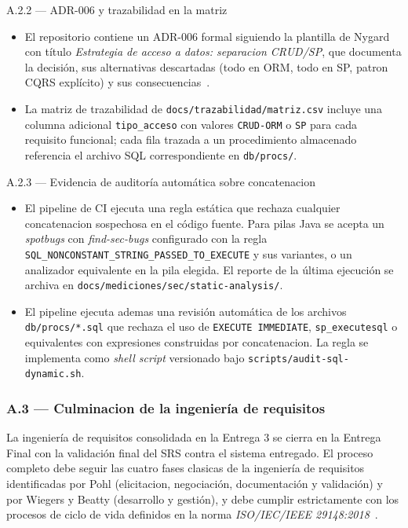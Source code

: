 \documentclass[11pt,a4paper]{article}
\begin{document}
\begin{cajarepo}{A.2.2 --- ADR-006 y trazabilidad en la matriz}
    \begin{itemize}
        \item El repositorio contiene un ADR-006 formal siguiendo la plantilla de Nygard con t\'{i}tulo \emph{Estrategia de acceso a datos: separacion CRUD/SP}, que documenta la decisi\'{o}n, sus alternativas descartadas (todo en ORM, todo en SP, patron CQRS expl\'{i}cito) y sus consecuencias~\cite{nygard2011adr}.
        \item La matriz de trazabilidad de \texttt{docs/trazabilidad/matriz.csv} incluye una columna adicional \texttt{tipo\_acceso} con valores \texttt{CRUD-ORM} o \texttt{SP} para cada requisito funcional; cada fila trazada a un procedimiento almacenado referencia el archivo SQL correspondiente en \texttt{db/procs/}.
    \end{itemize}
\end{cajarepo}

\begin{cajarepo}{A.2.3 --- Evidencia de auditor\'{i}a autom\'{a}tica sobre concatenacion}
    \begin{itemize}
        \item El pipeline de CI ejecuta una regla est\'{a}tica que rechaza cualquier concatenacion sospechosa en el c\'{o}digo fuente. Para pilas Java se acepta un \emph{spotbugs} con \emph{find-sec-bugs} configurado con la regla \texttt{SQL\_NONCONSTANT\_STRING\_PASSED\_TO\_EXECUTE} y sus variantes, o un analizador equivalente en la pila elegida. El reporte de la \'{u}ltima ejecuci\'{o}n se archiva en \texttt{docs/mediciones/sec/static-analysis/}.
        \item El pipeline ejecuta ademas una revisi\'{o}n autom\'{a}tica de los archivos \texttt{db/procs/*.sql} que rechaza el uso de \texttt{EXECUTE IMMEDIATE}, \texttt{sp\_executesql} o equivalentes con expresiones construidas por concatenacion. La regla se implementa como \emph{shell script} versionado bajo \texttt{scripts/audit-sql-dynamic.sh}.
    \end{itemize}
\end{cajarepo}

\subsubsection*{A.3 --- Culminacion de la ingenier\'{i}a de requisitos}

La ingenier\'{i}a de requisitos consolidada en la Entrega 3 se cierra en la Entrega Final con la validaci\'{o}n final del SRS contra el sistema entregado. El proceso completo debe seguir las cuatro fases clasicas de la ingenier\'{i}a de requisitos identificadas por Pohl (elicitacion, negociaci\'{o}n, documentaci\'{o}n y validaci\'{o}n) y por Wiegers y Beatty (desarrollo y gesti\'{o}n), y debe cumplir estrictamente con los procesos de ciclo de vida definidos en la norma \emph{ISO/IEC/IEEE 29148:2018}~\cite{iso29148,pohl2010requirements,wiegers2013software}.
\end{document}
